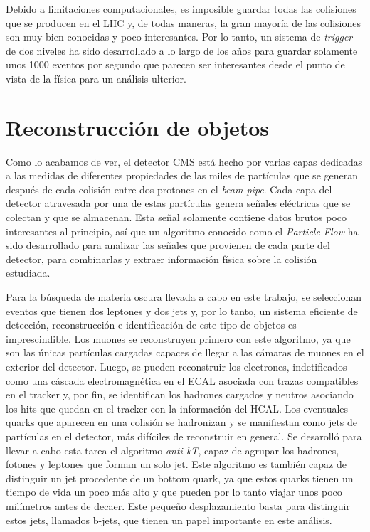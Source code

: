 \documentclass[a4paper, 10pt, openright]{report}
\begin{document}
\begin{appendices}
Debido a limitaciones computacionales, es imposible guardar todas las colisiones que se producen en el \ac{LHC} y, de todas maneras, la gran mayor\'{i}a de las colisiones son muy bien conocidas y poco interesantes. Por lo tanto, un sistema de \textit{trigger} de dos niveles ha sido desarrollado a lo largo de los a\~{n}os para guardar solamente unos 1000 eventos por segundo que parecen ser interesantes desde el punto de vista de la f\'{i}sica para un an\'{a}lisis ulterior.

\section{Reconstrucci\'{o}n de objetos}

Como lo acabamos de ver, el detector \ac{CMS} est\'{a} hecho por varias capas dedicadas a las medidas de diferentes propiedades de las miles de part\'{i}culas que se generan despu\'{e}s de cada colisi\'{o}n entre dos protones en el \textit{beam pipe}. Cada capa del detector atravesada por una de estas part\'{i}culas genera se\~{n}ales el\'{e}ctricas que se colectan y que se almacenan. Esta se\~{n}al solamente contiene datos brutos poco interesantes al principio, as\'{i} que un algoritmo conocido como el \textit{Particle Flow} ha sido desarrollado para analizar las se\~{n}ales que provienen de cada parte del detector, para combinarlas y extraer informaci\'{o}n f\'{i}sica sobre la colisi\'{o}n estudiada.

Para la b\'{u}squeda de materia oscura llevada a cabo en este trabajo, se seleccionan eventos que tienen dos leptones y dos jets y, por lo tanto, un sistema eficiente de detecci\'{o}n, reconstrucci\'{o}n e identificaci\'{o}n de este tipo de objetos es imprescindible. Los muones se reconstruyen primero con este algoritmo, ya que son las \'{u}nicas part\'{i}culas cargadas capaces de llegar a las c\'{a}maras de muones en el exterior del detector. Luego, se pueden reconstruir los electrones, indetificados como una c\'{a}scada electromagn\'{e}tica en el \ac{ECAL} asociada con trazas compatibles en el tracker y, por fin, se identifican los hadrones cargados y neutros asociando los hits que quedan en el tracker con la informaci\'{o}n del \ac{HCAL}. Los eventuales quarks que aparecen en una colisi\'{o}n se hadronizan y se manifiestan como jets de part\'{i}culas en el detector, m\'{a}s dif\'{i}ciles de reconstruir en general. Se desaroll\'{o} para llevar a cabo esta tarea el algoritmo \textit{anti-kT}, capaz de agrupar los hadrones, fotones y leptones que forman un solo jet. Este algoritmo es tambi\'{e}n capaz de distinguir un jet procedente de un bottom quark, ya que estos quarks tienen un tiempo de vida un poco m\'{a}s alto y que pueden por lo tanto viajar unos poco mil\'{i}metros antes de decaer. Este peque\~{n}o desplazamiento basta para distinguir estos jets, llamados b-jets, que tienen un papel importante en este an\'{a}lisis. 


\end{appendices}
\end{document}
